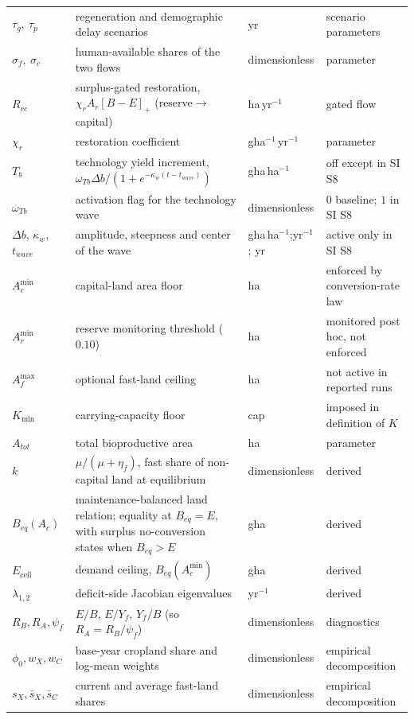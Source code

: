 \documentclass[11pt,a4paper]{article}
\newcommand{\pos}[1]{\left[#1\right]_+}
\newcommand{\Eceil}{E_{\mathrm{ceil}}}
\newcommand{\Acmin}{A_c^{\min}}
\begin{document}
\begin{longtable}{>{\raggedright\arraybackslash}p{}>{\raggedright\arraybackslash}p{}>{\raggedright\arraybackslash}p{}>{\raggedright\arraybackslash}p{}}
$\tau_g,\ \tau_p$ & regeneration and demographic delay scenarios & yr & scenario parameters \\
$\sigma_f,\ \sigma_c$ & human-available shares of the two flows & dimensionless & parameter \\
$R_{rc}$ & surplus-gated restoration, $\chi_rA_r\pos{B-E}$ (reserve$\to$capital) & ha\,yr$^{-1}$ & gated flow \\
$\chi_r$ & restoration coefficient & gha$^{-1}$\,yr$^{-1}$ & parameter \\
$T_b$ & technology yield increment, $\omega_{Tb}\Delta b/(1+e^{-\kappa_w(t-t_{wave})})$ & gha\,ha$^{-1}$ & off except in SI S8 \\
$\omega_{Tb}$ & activation flag for the technology wave & dimensionless & $0$ baseline; $1$ in SI S8 \\
$\Delta b$, $\kappa_w$, $t_{wave}$ & amplitude, steepness and center of the wave & gha\,ha$^{-1}$;\newline yr$^{-1}$; yr & active only in SI S8 \\
$\Acmin$ & capital-land area floor & ha & enforced by conversion-rate law \\
$A_r^{\min}$ & reserve monitoring threshold ($0.10$) & ha & monitored post hoc, not enforced \\
$A_f^{\max}$ & optional fast-land ceiling & ha & not active in reported runs \\
$K_{\min}$ & carrying-capacity floor & cap & imposed in definition of $K$ \\
$A_{tot}$ & total bioproductive area & ha & parameter \\
$k$ & $\mu/(\mu+\eta_f)$, fast share of non-capital land at equilibrium & dimensionless & derived \\
$B_{eq}(A_c)$ & maintenance-balanced land relation; equality at $B_{eq}=E$, with surplus no-conversion states when $B_{eq}>E$ & gha & derived \\
$\Eceil$ & demand ceiling, $B_{eq}(\Acmin)$ & gha & derived \\
$\lambda_{1,2}$ & deficit-side Jacobian eigenvalues & yr$^{-1}$ & derived \\
$R_B,R_A,\psi_f$ & $E/B$, $E/Y_f$, $Y_f/B$ (so $R_A=R_B/\psi_f$) & dimensionless & diagnostics \\
$\phi_0,w_X,w_C$ & base-year cropland share and log-mean weights & dimensionless & empirical decomposition \\
$s_X,\bar s_X,\bar s_C$ & current and average fast-land shares & dimensionless & empirical decomposition \\

\end{longtable}
\end{document}

